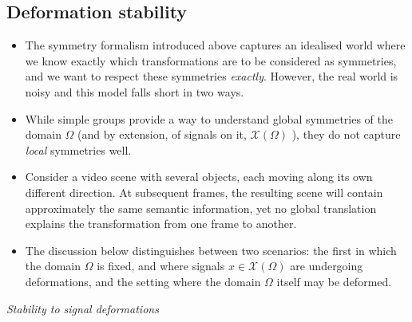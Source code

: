 \documentclass[12pt]{article}
\numberwithin{equation}{section}
\theoremstyle{definition}
\newcommand{		\n		}	{	\noindent					} %
\newcommand{		\1		}	{	\bm{1}					}%
\begin{document}
\subsection{Deformation stability}

\begin{itemize}

\item The symmetry formalism introduced above captures an idealised world where we know exactly which transformations are to be considered as symmetries, and we want to respect these symmetries \emph{exactly}. However, the real world is noisy and this model falls short in two ways.

\item While simple groups provide a way to understand global symmetries of the domain $\Omega$ (and by extension, of signals on it, $\mathcal{X}(\Omega)$ ), they do not capture \emph{local} symmetries well.

\item Consider a video scene with several objects, each moving along its own different direction. At subsequent frames, the resulting scene will contain approximately the same semantic information, yet no global translation explains the transformation from one frame to another. 

\item The discussion below distinguishes between two scenarios: the first in which the domain $\Omega$ is fixed, and where signals $x \in \mathcal{X}(\Omega)$ are undergoing deformations, and the setting where the domain $\Omega$ itself may be deformed. 

\end{itemize}

\n\hrulefill 
\emph{ Stability to signal deformations }
\hrulefill
\end{document}
